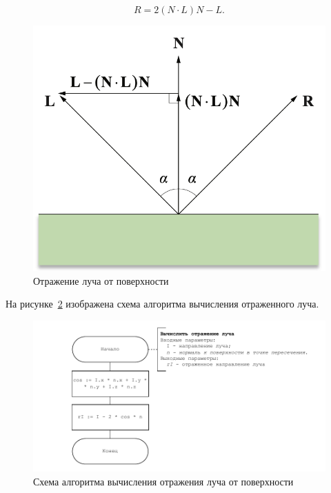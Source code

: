 \begin{equation}
	R = 2(N \cdot L)N - L.
\end{equation}

\begin{figure}[ht!]
	\begin{center}
		\includegraphics[scale=0.4]{img/reflection.png}
	\end{center}
	\caption{Отражение луча от поверхности~\cite[c.~150]{lengyel2011mathematics}}
	\label{fig:1}
\end{figure}

На рисунке~\ref{fig:refl} изображена схема алгоритма вычисления отраженного луча.

\begin{figure}[ht!]
	\begin{center}
		\includegraphics[scale=0.9]{diag/main-raytracing-reflect.pdf}
	\end{center}
	\caption{Схема алгоритма вычисления отражения луча от поверхности}
	\label{fig:refl}
\end{figure}

